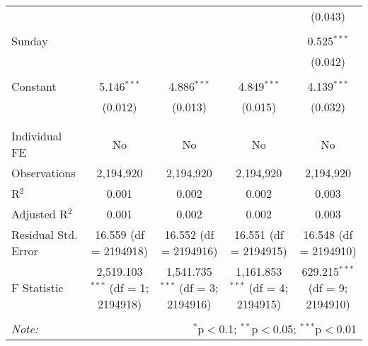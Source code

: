 \documentclass[
]{article}
\begin{document}
\begin{table}[!htbp]
{\begin{tabular}{@{\extracolsep{5pt}}lcccc}
  &  &  &  & (0.043) \\ 
  & & & & \\ 
 Sunday &  &  &  & 0.525$^{***}$ \\ 
  &  &  &  & (0.042) \\ 
  & & & & \\ 
 Constant & 5.146$^{***}$ & 4.886$^{***}$ & 4.849$^{***}$ & 4.139$^{***}$ \\ 
  & (0.012) & (0.013) & (0.015) & (0.032) \\ 
  & & & & \\ 
\hline \\[-1.8ex] 
Individual FE & No & No & No & No \\ 
Observations & 2,194,920 & 2,194,920 & 2,194,920 & 2,194,920 \\ 
R$^{2}$ & 0.001 & 0.002 & 0.002 & 0.003 \\ 
Adjusted R$^{2}$ & 0.001 & 0.002 & 0.002 & 0.003 \\ 
Residual Std. Error & 16.559 (df = 2194918) & 16.552 (df = 2194916) & 16.551 (df = 2194915) & 16.548 (df = 2194910) \\ 
F Statistic & 2,519.103$^{***}$ (df = 1; 2194918) & 1,541.735$^{***}$ (df = 3; 2194916) & 1,161.853$^{***}$ (df = 4; 2194915) & 629.215$^{***}$ (df = 9; 2194910) \\ 
\hline 
\hline \\[-1.8ex] 
\textit{Note:}  & \multicolumn{4}{r}{$^{*}$p$<$0.1; $^{**}$p$<$0.05; $^{***}$p$<$0.01} \\ 
\end{tabular}
} 
\end{table} 
\newpage
\end{document}
